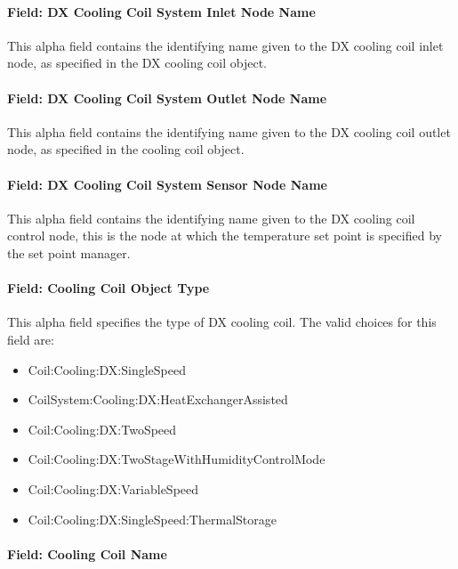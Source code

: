 \paragraph{Field: DX Cooling Coil System Inlet Node Name}\label{field-dx-cooling-coil-system-inlet-node-name}

This alpha field contains the identifying name given to the DX cooling coil inlet node, as specified in the DX cooling coil object.

\paragraph{Field: DX Cooling Coil System Outlet Node Name}\label{field-dx-cooling-coil-system-outlet-node-name}

This alpha field contains the identifying name given to the DX cooling coil outlet node, as specified in the cooling coil object.

\paragraph{Field: DX Cooling Coil System Sensor Node Name}\label{field-dx-cooling-coil-system-sensor-node-name}

This alpha field contains the identifying name given to the DX cooling coil control node, this is the node at which the temperature set point is specified by the set point manager.

\paragraph{Field: Cooling Coil Object Type}\label{field-cooling-coil-object-type-000}

This alpha field specifies the type of DX cooling coil. The valid choices for this field are:

\begin{itemize}
\item
  Coil:Cooling:DX:SingleSpeed
\item
  CoilSystem:Cooling:DX:HeatExchangerAssisted
\item
  Coil:Cooling:DX:TwoSpeed
\item
  Coil:Cooling:DX:TwoStageWithHumidityControlMode
\item
  Coil:Cooling:DX:VariableSpeed
\item
  Coil:Cooling:DX:SingleSpeed:ThermalStorage
\end{itemize}

\paragraph{Field: Cooling Coil Name}\label{field-cooling-coil-name-000}

